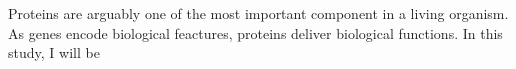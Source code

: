 Proteins are arguably one of the most important component in a living organism. As genes encode biological feactures, proteins deliver biological functions.  In this study, I will be 